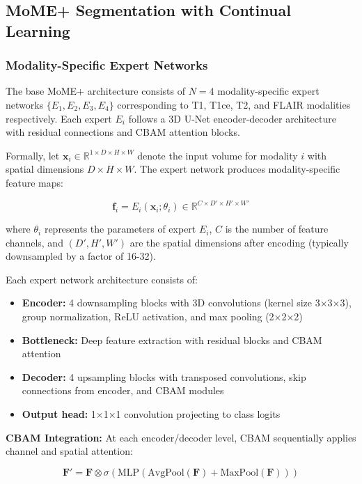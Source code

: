 \documentclass[conference]{IEEEtran}
\begin{document}
\subsection{MoME+ Segmentation with Continual Learning}

\subsubsection{Modality-Specific Expert Networks}

The base MoME+ architecture consists of $N=4$ modality-specific expert networks $\{E_1, E_2, E_3, E_4\}$ corresponding to T1, T1ce, T2, and FLAIR modalities respectively. Each expert $E_i$ follows a 3D U-Net encoder-decoder architecture with residual connections and CBAM attention blocks.

Formally, let $\mathbf{x}_i \in \mathbb{R}^{1 \times D \times H \times W}$ denote the input volume for modality $i$ with spatial dimensions $D \times H \times W$. The expert network produces modality-specific feature maps:

\begin{equation}
\mathbf{f}_i = E_i(\mathbf{x}_i; \theta_i) \in \mathbb{R}^{C \times D' \times H' \times W'}
\end{equation}

where $\theta_i$ represents the parameters of expert $E_i$, $C$ is the number of feature channels, and $(D', H', W')$ are the spatial dimensions after encoding (typically downsampled by a factor of 16-32).

Each expert network architecture consists of:
\begin{itemize}
\item \textbf{Encoder:} 4 downsampling blocks with 3D convolutions (kernel size 3×3×3), group normalization, ReLU activation, and max pooling (2×2×2)
\item \textbf{Bottleneck:} Deep feature extraction with residual blocks and CBAM attention
\item \textbf{Decoder:} 4 upsampling blocks with transposed convolutions, skip connections from encoder, and CBAM modules
\item \textbf{Output head:} 1×1×1 convolution projecting to class logits
\end{itemize}

\textbf{CBAM Integration:} At each encoder/decoder level, CBAM sequentially applies channel and spatial attention:

\begin{equation}
\mathbf{F}' = \mathbf{F} \otimes \sigma(\text{MLP}(\text{AvgPool}(\mathbf{F}) + \text{MaxPool}(\mathbf{F})))
\end{equation}
\end{document}

